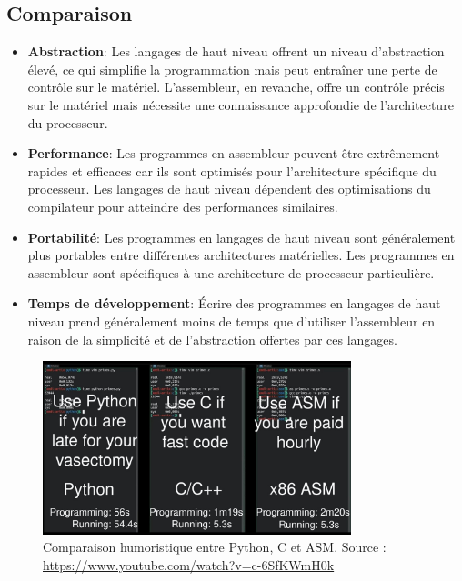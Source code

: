 \documentclass[a4paper, 12pt]{report}
\begin{document}
\break\subsection{Comparaison}
\begin{itemize}
  \item \textbf{Abstraction}: Les langages de haut niveau offrent un niveau d'abstraction élevé, ce qui simplifie la programmation mais peut entraîner une perte de contrôle sur le matériel. L'assembleur, en revanche, offre un contrôle précis sur le matériel mais nécessite une connaissance approfondie de l'architecture du processeur.
  \item \textbf{Performance}: Les programmes en assembleur peuvent être extrêmement rapides et efficaces car ils sont optimisés pour l'architecture spécifique du processeur. Les langages de haut niveau dépendent des optimisations du compilateur pour atteindre des performances similaires.
  \item \textbf{Portabilité}: Les programmes en langages de haut niveau sont généralement plus portables entre différentes architectures matérielles. Les programmes en assembleur sont spécifiques à une architecture de processeur particulière.
  \item \textbf{Temps de développement}: Écrire des programmes en langages de haut niveau prend généralement moins de temps que d'utiliser l'assembleur en raison de la simplicité et de l'abstraction offertes par ces langages.
\end{itemize}

\begin{figure}[H]
  \centering
  \includegraphics[width=0.8\textwidth]{imgs/compPythonAsm.jpg}
  \caption{Comparaison humoristique entre Python, C et ASM. Source : \url{https://www.youtube.com/watch?v=c-6SfKWmH0k} \cite{4}}
\end{figure}
\end{document}
